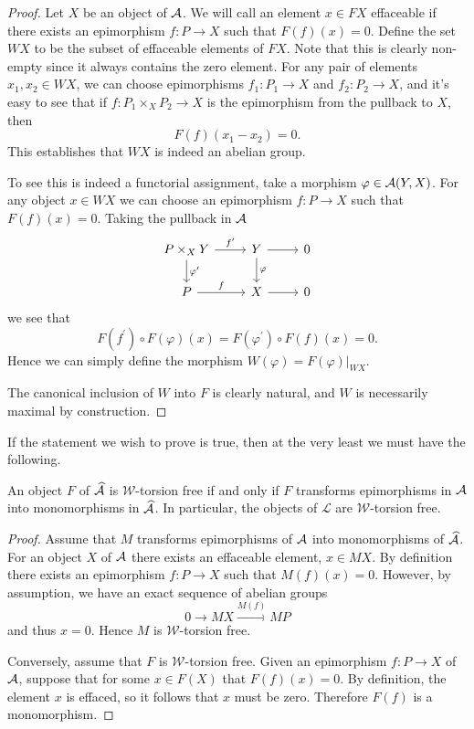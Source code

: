 \documentclass[reqno, 12pt]{amsart}
\begin{document}
\begin{proof}
  Let $X$ be an object of $\mathcal{A}$.
  We will call an element $x \in FX$ effaceable if there exists an epimorphism $f \colon P \to X$ such that $F(f)(x) = 0$.
  Define the set $WX$ to be the subset of effaceable elements of $FX$.
  Note that this is clearly non-empty since it always contains the zero element.
  For any pair of elements $x_1, x_2 \in WX$, we can choose epimorphisms
  $f_1 \colon P_1 \to X$ and $f_2 \colon P_2 \to X$, and it's easy to see that if $f \colon P_1 \times_X P_2 \to X$ is the epimorphism from the pullback to $X$, then
  $$F(f)(x_1 - x_2) = 0.$$
  This establishes that $WX$ is indeed an abelian group.

  To see this is indeed a functorial assignment, take a morphism $\varphi \in \mathcal{A}(Y, X)$.
  For any object $x \in WX$ we can choose an epimorphism $f \colon P \to X$ such that $F(f)(x) = 0$.
  Taking the pullback in $\mathcal{A}$
  $$\begin{tikzcd}
    P \times_X Y\arrow{r}{f^\prime}\arrow{d}{\varphi^\prime} & Y \arrow{r}\arrow{d}{\varphi} & 0\\
    P \arrow{r}{f} & X \arrow{r} & 0
  \end{tikzcd}$$
  we see that
  $$F(f^\prime) \circ F(\varphi)(x) = F(\varphi^\prime) \circ F(f)(x) = 0.$$
  Hence we can simply define the morphism $W(\varphi) = F(\varphi)|_{WX}$.

  The canonical inclusion of $W$ into $F$ is clearly natural, and $W$ is necessarily maximal by construction.
\end{proof}

If the statement we wish to prove is true, then at the very least we must have the following.
\begin{lemma}
  An object $F$ of $\widehat{\mathcal{A}}$ is $\mathcal{W}$-torsion free if and only if $F$ transforms epimorphisms in $\mathcal{A}$ into monomorphisms in $\widehat{\mathcal{A}}$.
  In particular, the objects of $\mathcal{L}$ are $\mathcal{W}$-torsion free.
\end{lemma}
\begin{proof}
  Assume that $M$ transforms epimorphisms of $\mathcal{A}$ into monomorphisms of $\widehat{\mathcal{A}}$.
  For an object $X$ of $\mathcal{A}$ there exists an effaceable element, $x \in MX$.
  By definition there exists an epimorphism $f \colon P \to X$ such that $M(f)(x) = 0$.
  However, by assumption, we have an exact sequence of abelian groups
  $$0 \to MX \overset{M(f)}\to MP$$
  and thus $x = 0$.
  Hence $M$ is $\mathcal{W}$-torsion free.

  Conversely, assume that $F$ is $\mathcal{W}$-torsion free.
  Given an epimorphism $f \colon P \to X$ of $\mathcal{A}$, suppose that for some $x \in F(X)$ that $F(f)(x) = 0$.
  By definition, the element $x$ is effaced, so it follows that $x$ must be zero.
  Therefore $F(f)$ is a monomorphism.
\end{proof}
\end{document}
